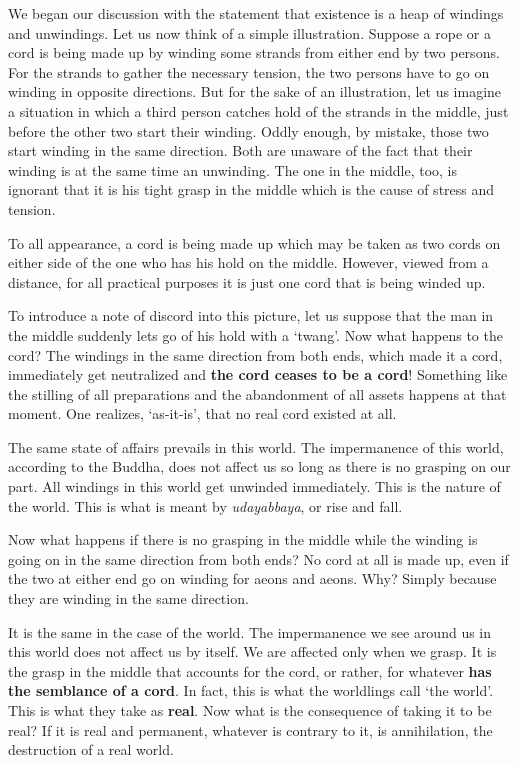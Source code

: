 We began our discussion with the statement that existence is a heap of windings and unwindings. Let us now think of a simple illustration. Suppose a rope or a cord is being made up by winding some strands from either end by two persons. For the strands to gather the necessary tension, the two persons have to go on winding in opposite directions. But for the sake of an illustration, let us imagine a situation in which a third person catches hold of the strands in the middle, just before the other two start their winding. Oddly enough, by mistake, those two start winding in the same direction. Both are unaware of the fact that their winding is at the same time an unwinding. The one in the middle, too, is ignorant that it is his tight grasp in the middle which is the cause of stress and tension.

To all appearance, a cord is being made up which may be taken as two cords on either side of the one who has his hold on the middle. However, viewed from a distance, for all practical purposes it is just one cord that is being winded up.

To introduce a note of discord into this picture, let us suppose that the man in the middle suddenly lets go of his hold with a `twang'. Now what happens to the cord? The windings in the same direction from both ends, which made it a cord, immediately get neutralized and \textbf{the cord ceases to be a cord}! Something like the stilling of all preparations and the abandonment of all assets happens at that moment. One realizes, `as-it-is', that no real cord existed at all.

The same state of affairs prevails in this world. The impermanence of this world, according to the Buddha, does not affect us so long as there is no grasping on our part. All windings in this world get unwinded immediately. This is the nature of the world. This is what is meant by \emph{udayabbaya}, or rise and fall.

Now what happens if there is no grasping in the middle while the winding is going on in the same direction from both ends? No cord at all is made up, even if the two at either end go on winding for aeons and aeons. Why? Simply because they are winding in the same direction.

It is the same in the case of the world. The impermanence we see around us in this world does not affect us by itself. We are affected only when we grasp. It is the grasp in the middle that accounts for the cord, or rather, for whatever \textbf{has the semblance of a cord}. In fact, this is what the worldlings call `the world'. This is what they take as \textbf{real}. Now what is the consequence of taking it to be real? If it is real and permanent, whatever is contrary to it, is annihilation, the destruction of a real world.

